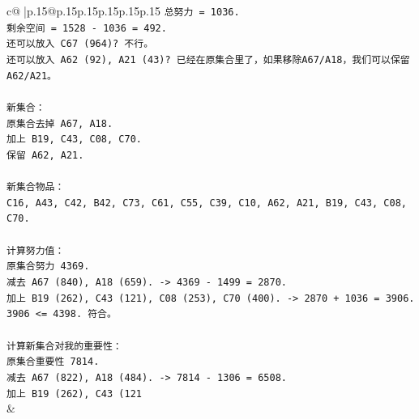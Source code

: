 \documentclass{article}
\begin{document}
{\begin{supertabular}{c@{$\;$}|p{.15\linewidth}@{}p{.15\linewidth}p{.15\linewidth}p{.15\linewidth}p{.15\linewidth}p{.15\linewidth}}
{{{\texttt{总努力 = 1036.} \\
\texttt{剩余空间 = 1528 {-} 1036 = 492.} \\
\texttt{还可以放入 C67 (964)? 不行。} \\
\texttt{还可以放入 A62 (92), A21 (43)? 已经在原集合里了，如果移除A67/A18，我们可以保留A62/A21。} \\
\\ 
\texttt{新集合：} \\
\texttt{原集合去掉 A67, A18.} \\
\texttt{加上 B19, C43, C08, C70.} \\
\texttt{保留 A62, A21.} \\
\\ 
\texttt{新集合物品：} \\
\texttt{C16, A43, C42, B42, C73, C61, C55, C39, C10, A62, A21, B19, C43, C08, C70.} \\
\\ 
\texttt{计算努力值：} \\
\texttt{原集合努力 4369.} \\
\texttt{减去 A67 (840), A18 (659). {-}> 4369 {-} 1499 = 2870.} \\
\texttt{加上 B19 (262), C43 (121), C08 (253), C70 (400). {-}> 2870 + 1036 = 3906.} \\
\texttt{3906 <= 4398. 符合。} \\
\\ 
\texttt{计算新集合对我的重要性：} \\
\texttt{原集合重要性 7814.} \\
\texttt{减去 A67 (822), A18 (484). {-}> 7814 {-} 1306 = 6508.} \\
\texttt{加上 B19 (262), C43 (121} \\
            }
        }
    }
    & \\ \\


\end{supertabular}}
\end{document}
